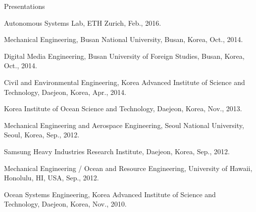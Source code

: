 \begin{rSection}{Presentations}
\begin{pubSubsectionNum}{}

  \item Autonomous Systems Lab, ETH Zurich, Feb., 2016.



  \item Mechanical Engineering, Busan National University, Busan, Korea, Oct., 2014.
  \item Digital Media Engineering, Busan University of Foreign Studies, Busan, Korea, Oct., 2014.
  \item Civil and Environmental Engineering, Korea Advanced Institute of Science and Technology, Daejeon, Korea, Apr., 2014.
  \item Korea Institute of Ocean Science and Technology, Daejeon, Korea, Nov., 2013.
  \item Mechanical Engineering and Aerospace Engineering, Seoul National University, Seoul, Korea, Sep., 2012.
  \item Samsung Heavy Industries Research Institute, Daejeon, Korea, Sep., 2012.
  \item Mechanical Engineering / Ocean and Resource Engineering, University of Hawaii, Honolulu, HI, USA, Sep., 2012.
  \item Ocean Systems Engineering, Korea Advanced Institute of Science and Technology, Daejeon, Korea, Nov., 2010.
\end{pubSubsectionNum}

\end{rSection}

